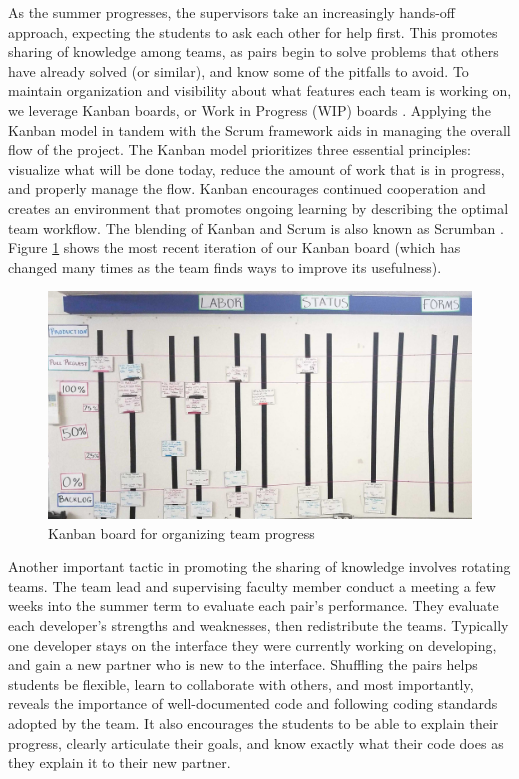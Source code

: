 As the summer progresses, the supervisors take an increasingly hands-off approach, expecting the students to ask each other for help first. This promotes sharing of knowledge among teams, as pairs begin to solve problems that others have already solved (or similar), and know some of the pitfalls to avoid. To maintain organization and visibility about what features each team is working on, we leverage Kanban boards, or Work in Progress (WIP) boards \cite{anderson2010kanban}. Applying the Kanban model in tandem with the Scrum framework aids in managing the overall flow of the project. The Kanban model prioritizes three essential principles: visualize what will be done today, reduce the amount of work that is in progress, and properly manage the flow. Kanban encourages continued cooperation and creates an environment that promotes ongoing learning by describing the optimal team workflow. The blending of Kanban and Scrum is also known as Scrumban \cite{ladas2009scrumban}. Figure \ref{kanban} shows the most recent iteration of our Kanban board (which has changed many times as the team finds ways to improve its usefulness).

\begin{figure}[h]
 \centering
 \label{kanban}
 \includegraphics[width=\linewidth]{kanban.jpg}
 \caption{Kanban board for organizing team progress}
\end{figure}

Another important tactic in promoting the sharing of knowledge involves rotating teams. The team lead and supervising faculty member conduct a meeting a few weeks into the summer term to evaluate each pair's performance. They evaluate each developer's strengths and weaknesses, then redistribute the teams. Typically one developer stays on the interface they were currently working on developing, and gain a new partner who is new to the interface. Shuffling the pairs helps students be flexible, learn to collaborate with others, and most importantly, reveals the importance of well-documented code and following coding standards adopted by the team. It also encourages the students to be able to explain their progress, clearly articulate their goals, and know exactly what their code does as they explain it to their new partner. 

